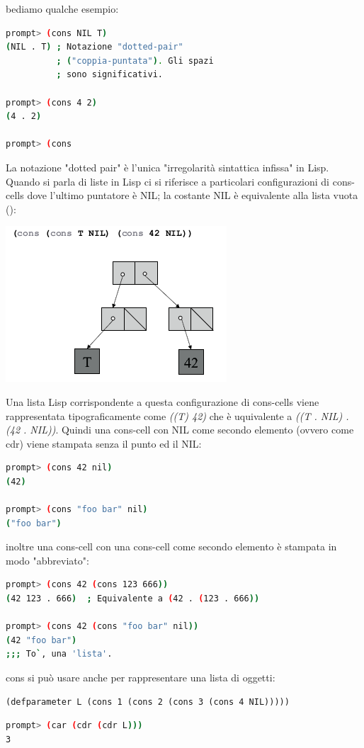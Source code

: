 \documentclass[a4paper,12pt, oneside]{book}
\begin{document}
bediamo qualche esempio:
\begin{shaded}
\begin{lstlisting}[language=bash]
prompt> (cons NIL T)
(NIL . T) ; Notazione "dotted-pair"
          ; ("coppia-puntata"). Gli spazi
          ; sono significativi.
          
prompt> (cons 4 2)
(4 . 2)

prompt> (cons
\end{lstlisting}
\end{shaded}
La notazione "dotted pair" è l'unica "irregolarità sintattica infissa" in Lisp.		
\\
Quando si parla di liste in Lisp ci si riferisce a particolari configurazioni di cons-cells dove l'ultimo puntatore è NIL; la costante NIL è equivalente alla lista vuota ():
\begin{center}
\includegraphics[scale=0.7]{img/cons3.png}
\end{center}
Una lista Lisp corrispondente a questa configurazione di cons-cells viene rappresentata tipograficamente come \textit{((T) 42)} che è uquivalente a \textit{((T . NIL) . (42 . NIL))}. Quindi una cons-cell con NIL come secondo
elemento (ovvero come cdr) viene stampata senza il punto ed il NIL:
\begin{shaded}
\begin{lstlisting}[language=bash]
prompt> (cons 42 nil)
(42)

prompt> (cons "foo bar" nil)
("foo bar")
\end{lstlisting}
\end{shaded}
inoltre una cons-cell con una cons-cell come secondo elemento è stampata in modo "abbreviato":
\begin{shaded}
\begin{lstlisting}[language=bash]
prompt> (cons 42 (cons 123 666))
(42 123 . 666)  ; Equivalente a (42 . (123 . 666))

prompt> (cons 42 (cons "foo bar" nil))
(42 "foo bar")
;;; To`, una 'lista'.
\end{lstlisting}
\end{shaded}
cons si può usare anche per rappresentare una lista di oggetti:
\begin{verbatim}
(defparameter L (cons 1 (cons 2 (cons 3 (cons 4 NIL)))))
\end{verbatim}
\begin{shaded}
\begin{lstlisting}[language=bash]
prompt> (car (cdr (cdr L)))
3
\end{lstlisting}
\end{shaded}
\end{document}
